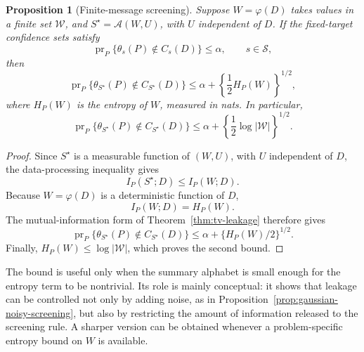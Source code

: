 \documentclass[11pt]{article}
\newtheorem{proposition}{Proposition}
\begin{document}
\begin{proposition}[Finite-message screening]
	\label{prop:finite-message}
	Suppose \(W=\varphi(D)\) takes values in a finite set \(\mathcal W\), and
	\(S^\star=\mathcal A(W,U)\), with \(U\) independent of \(D\). If the fixed-target
	confidence sets satisfy
	\[
	\operatorname{pr}_P\{\theta_s(P)\notin C_s(D)\}\leq \alpha,
	\qquad s\in\mathcal S,
	\]
	then
	\[
	\operatorname{pr}_P\{\theta_{S^\star}(P)\notin C_{S^\star}(D)\}
	\leq
	\alpha+
	\left\{\frac{1}{2}H_P(W)\right\}^{1/2},
	\]
	where \(H_P(W)\) is the entropy of \(W\), measured in nats. In particular,
	\[
	\operatorname{pr}_P\{\theta_{S^\star}(P)\notin C_{S^\star}(D)\}
	\leq
	\alpha+
	\left\{\frac{1}{2}\log |\mathcal W|\right\}^{1/2}.
	\]
\end{proposition}

\begin{proof}
	Since \(S^\star\) is a measurable function of \((W,U)\), with \(U\) independent
	of \(D\), the data-processing inequality gives
	\[
	I_P(S^\star;D)\leq I_P(W;D).
	\]
	Because \(W=\varphi(D)\) is a deterministic function of \(D\),
	\[
	I_P(W;D)=H_P(W).
	\]
	The mutual-information form of Theorem~\ref{thm:tv-leakage} therefore gives
	\[
	\operatorname{pr}_P\{\theta_{S^\star}(P)\notin C_{S^\star}(D)\}
	\leq
	\alpha+\{H_P(W)/2\}^{1/2}.
	\]
	Finally, \(H_P(W)\leq \log|\mathcal W|\), which proves the second bound.
\end{proof}

The bound is useful only when the summary alphabet is small enough for the entropy term to be nontrivial. Its role is mainly conceptual: it shows that leakage can be controlled not only by adding noise, as in
Proposition~\ref{prop:gaussian-noisy-screening}, but also by restricting the amount of information released to the screening rule. A sharper version can be obtained whenever a problem-specific entropy bound on \(W\) is available.
\end{document}
